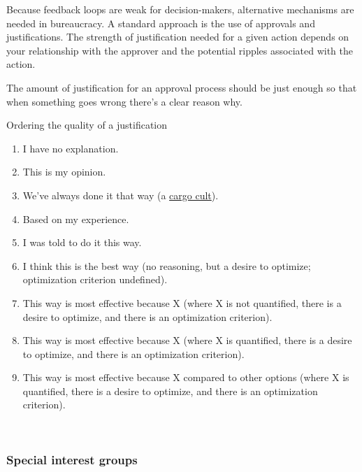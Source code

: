
Because feedback loops are weak for decision-makers, alternative mechanisms are needed in bureaucracy. A standard approach is the use of approvals and justifications. The strength of justification needed for a given action depends on your relationship with the approver and the potential ripples associated with the action. 

The amount of justification for an approval process should be just enough so that when something goes wrong there's a clear reason why. 

Ordering the quality of a justification
\begin{enumerate}
    \item I have no explanation.
    \item This is my opinion.
    \item We've always done it that way (a \href{https://en.wikipedia.org/wiki/Cargo_cult}{cargo cult}).
    \item Based on my experience.
    \item I was told to do it this way.
    \item I think this is the best way (no reasoning, but a desire to optimize; optimization criterion undefined).
    \item This way is most effective because X (where X is not quantified, there is a desire to optimize, and there is an optimization criterion).
    \item This way is most effective because X (where X is quantified, there is a desire to optimize, and there is an optimization criterion).
    \item This way is most effective because X compared to other options (where X is quantified, there is a desire to optimize, and there is an optimization criterion).
\end{enumerate}


\ \\



\subsubsection*{Special interest groups}

